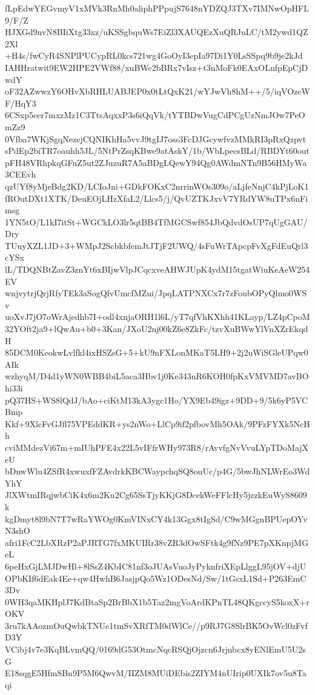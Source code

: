 fLpEdwYEGvmyV1xMVk3RnMh0aliphPPpujS7648nYDZQJ3TXv7IMNwOpHFL9/F/Z
HJXGd9nvN8BIiXtg33xz/uKSSgbquWs7EiZl3XAUQEzXuQRJuLC/tM2ywd1QZ2Xl
+H4s/fwCyR4SNPlPUCypRL0kcs721wg4GoOyI3epIa97Di1Y0LsSSpq9b9je2kJd
IAHHratwit9EW2HPE2VWf88/xuBWc2bBRx7vIsz+t3nMoFk0EAxOLufpEpCjDwdY
oF32AZwwzY6OHvXbRHLUABJEP0x0tLtQxK21/wYJwVh8hM++/5/iqVOzeWF/HqY3
6CSxp5eer7mxzMz1C3TtsAqxxP3s6iQqVk/tYTBDwVugCdPCgUzNmJOw7PeOmZz9
0Vfba7WKjSgqNezejCQNIKhHa5vvJ9tgIJ7oss3FcDJGcywfvzMMkRI3pRxQzpvt
sPdEp2biTR7oauhh5JL/5NtPrZsqKBwe9atAskY/1b/WbLpecsBLd/RBDYt60out
pFH48VRhpkqGFuZ5ut2ZJuzuR7A5aBDgLQewY94Qg0AWdmNTn9B56HMyWa3CEEvh
qzUYf8yMjeBdg2KD/LCIoJni+GDkFOKxC2nrrinWOs309o/aLjfeNnjC4kPjLoK1
fROutDXt1XTK/DeuEOjLHzXfaL2/Llcs5/j/QvUZTKJxvV7YRdYW8uTPx6nFimsg
1YN5tO/L1kI7itSt+WGCkLO3lr5qtBB4TfMGCSwf854JbQdvdOsUP7qUgGAU/Dry
TUuyXZL1JD+3+WMpJ2ScbkbfemJtJTjF2UWQ/4sFuWrTApcpFvXgFdEuQrl3cYSx
lL/TDQNBtZavZ3znYt6xBIjwVlpJCqcxveAHWJUpK4ydM15tgatWiuKeAeW254EV
wnjvytrjQrjRfyTEk3aSogQfvUmcfMZui/JpqLATPNXCx7r7zFoubOPyQlmo0WSv
uoXvJ7jO7oWrAjedhb7I+odl4xnjaORH1l6L/yT7qfVhKXhh41KLayp/LZ4pCpoM
32YOft2ja9+lQwAu+b0+3Kan/JXoU2nj00kZ6e8ZkFc/tzvXuBWwYlVnXZrEkqdH
85DCM0KeokwLvlfkl4ixHSZsG+5+kU9nFXLonMKaT5LH9+2j2uWiSGleUPqw0AIk
wzhyqM/D4d1yWN0WBB4biL5aca3Hbv1j0Ke343nR6KOH0fpKxVMVMD7avBOhi33i
pQ37HS+WS8lQdJ/bAo+ciKtM13kA3ygc1Ho/YX9Eb49igz+9DD+9/5k6yP5VCBmp
Kkf+9XlcFvGJfl75VPEddKR+ys2nWo+LlCp9if2pfbovMh5OAk/9PFzFYXk5NcHh
cviMMdezVi67m+mIUhPFE4x22L5vIFfrWHy973R8/rAvvfgNvVvuLYpTDoMajXeU
bDnwWlu4ZSfR4xwuxfFZAvdrkKBCWaypchqSQ8ouUc/p4G/5bwJhNLWrEo3WdYhY
JlXWtmIRqjwbCiK4x6m2Ku2Cg65SsTjyKKjG8DcekWeFFlcHy5jzzkEuWyS8609k
kgDmyt8l9bN7T7wRaYWOg0KmVINxCY4k13Ggx8tIgSd/C9wMGgnBPUepOYvN3shO
afri1FcC2LbXRzP2aPJRTG7fxMKUIRr38vZR3dOwSFtk4g9fNz9PE7pXKnpjMGeL
6peHxGjLMJDwHl+8lSsZ4KbIC81nf3oJUAsVuoJyPyknfriXEpLlggL95jOV+djU
OPbKIf6dEak4Ee+qw4HwhB6JasjpQo5Wz1ODesNd/Sw/1tGsxL1Sd+P263EmC3Dv
0WH3qaMKHplJ7KdBtaSp2BrBbX1b5Taz2mgVoArdKPnTL48QKgccyS5koxX+rOKV
3ru7kAAozmOuQwbkTNUe1tmSvXRfTM0dWlCe//p9RJ7G8SlrBK5OvWcl0zFvfD3Y
VCibj4v7e3KqBLvmQQ/0169dG53OtmcNqcRSQjOjzcn6Jrjnbcx8yENlEmU5U2sG
E18sqgE5HfmSBn9P5M6QwvM/IIZM8MUiDEbis2ZIYM4nUIrip0UXIk7ov5u8Taqi
